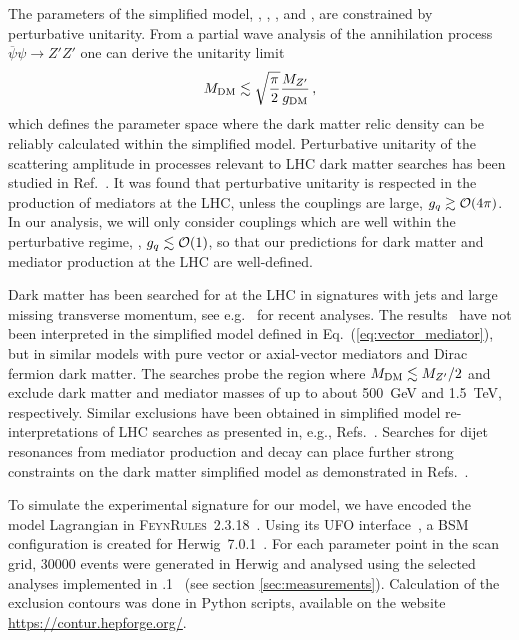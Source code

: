 \documentclass[floatfix]{article}
\begin{document}
The parameters of the simplified model, \GDM, \GQ, \MDM, and \MZP, are constrained by perturbative unitarity. 
From a partial wave analysis of the annihilation process $\overline{\psi}\psi \to Z' Z'$ one can derive the unitarity limit~\cite{Kahlhoefer:2015bea}
\begin{equation}
M_{\rm DM} \lesssim \sqrt{\frac{\pi}{2}} \frac{M_{Z^{\prime}}}{g_{\rm DM}}\,,
\end{equation}
which defines the parameter space where the dark matter relic density can be reliably calculated within the simplified model. 
Perturbative unitarity of the scattering amplitude in processes relevant to LHC dark matter searches has been studied in Ref.~\cite{Englert:2016joy}. 
It was found that perturbative unitarity is respected in the production of mediators at the LHC, unless 
the couplings are large, $g_{q} \gtrsim {\cal O}(4\pi)$. In our analysis, we will only consider couplings which are well within the 
perturbative regime, \GDM, $g_{q} \lesssim {\cal O}(1)$, so that our predictions for dark matter and mediator production at the LHC 
are well-defined. 

Dark matter has been searched for at the LHC in signatures with jets and large missing transverse momentum, see e.g.~\cite{Aaboud:2016tnv,CMS:2016tns} 
for recent analyses. 
The results~\cite{Aaboud:2016tnv,CMS:2016tns}  have not been interpreted in the simplified model defined in Eq.~(\ref{eq:vector_mediator}), but in 
similar models with pure vector or axial-vector mediators and Dirac fermion dark matter. The  searches probe the region where $M_{\rm DM} \lesssim M_{Z^{\prime}}/2$ 
and exclude dark matter and mediator masses of up to about 500~GeV and 1.5~TeV, respectively. Similar exclusions have been obtained in simplified 
model re-interpretations of LHC searches as presented in, e.g.,  Refs.~\cite{Kahlhoefer:2015bea, Heisig:2015ira}. Searches for dijet resonances from 
mediator production and decay can place further strong constraints on the dark matter simplified model as demonstrated in Refs.~\cite{Chala:2015ama,Fairbairn:2016iuf}. 

To simulate the experimental signature for our model, we have encoded the model Lagrangian in \textsc{FeynRules}~2.3.18~\cite{Alloul:2013bka}. Using its UFO interface~\cite{Degrande:2011ua},
a BSM configuration is created for Herwig~7.0.1~\cite{Bellm:2015jjp,Bahr:2008pv}. For each parameter point in the scan grid, 30000 events were generated in Herwig and 
analysed using the selected analyses implemented in  
 .1~\cite{Buckley:2010ar} (see section \ref{sec:measurements}). Calculation of the exclusion contours was done in Python scripts, available on the \Contur website \url{https://contur.hepforge.org/}.
\end{document}
